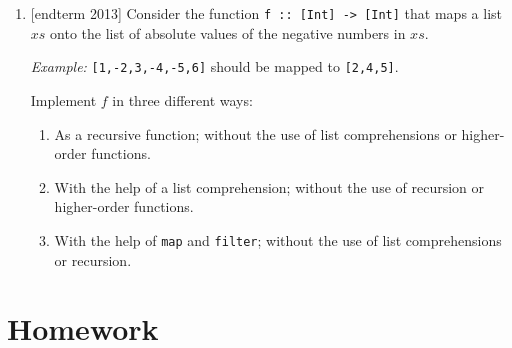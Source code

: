 \documentclass{article}
\begin{document}
\begin{enumerate}
\item {[endterm 2013]} Consider the function \verb|f :: [Int] -> [Int]| that maps a list $xs$ onto the list of absolute values of the negative numbers in $xs$. \par
\textit{Example:} \verb|[1,-2,3,-4,-5,6]| should be mapped to \verb|[2,4,5]|. \par
Implement $f$ in three different ways:
\begin{enumerate}
\item As a recursive function; without the use of list comprehensions or higher-order functions.
\item With the help of a list comprehension; without the use of recursion or higher-order functions.
\item With the help of \verb|map| and \verb|filter|; without the use of list comprehensions or recursion.
\end{enumerate}
\end{enumerate}

\section{Homework}

\printbibliography
\end{document}
